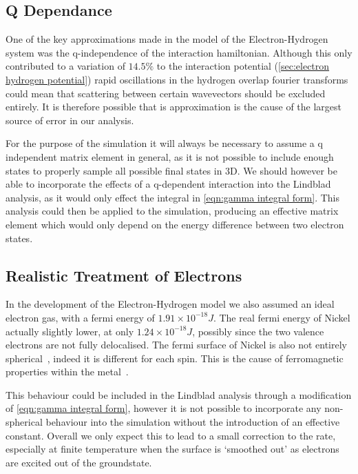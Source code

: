 

\subsection{Q Dependance}
One of the key approximations
made in the model of the
Electron-Hydrogen system
was the q-independence of
the interaction hamiltonian.
Although this only contributed
to a variation of
\(14.5\% \) to the interaction
potential
(\cref{sec:electron hydrogen potential})
rapid oscillations
in the hydrogen overlap
fourier transforms
could mean that scattering
between certain wavevectors
should be excluded entirely.
It is therefore possible
that is approximation
is the cause of
the largest source of
error in our analysis.

For the purpose
of the simulation
it will always
be necessary to assume a
q independent
matrix element in general,
as it is not possible
to include enough
states to properly
sample all possible final
states in 3D.
We should however be able
to incorporate the
effects of a q-dependent
interaction into the
Lindblad analysis,
as it would only effect
the integral in \cref{eqn:gamma integral form}.
This analysis could then
be applied to the simulation,
producing an effective matrix
element which would only depend
on the energy difference between
two electron states.


\subsection{Realistic Treatment of Electrons}
In the development
of the Electron-Hydrogen
model we also assumed
an ideal electron gas,
with a fermi energy
of \(1.91\times{}10^{-18}J\).
The real fermi energy
of Nickel actually slightly lower,
at only \(1.24\times{} 10^{-18}J\),
possibly since the two
valence electrons are not
fully delocalised.
The fermi surface of Nickel
is also not entirely
spherical~\cite{FermiSufaceNickel},
indeed it is different
for each spin.
This is the cause of
ferromagnetic properties
within the metal~\cite{PhysRev.49.537}.

This behaviour could
be included in the
Lindblad analysis through
a modification of \cref{eqn:gamma integral form},
however it is not possible
to incorporate any
non-spherical behaviour
into the simulation
without the introduction of
an effective constant.
Overall we only expect
this to lead to a small
correction to the rate,
especially at finite temperature
when the surface is `smoothed out'
as electrons are excited out
of the groundstate.





